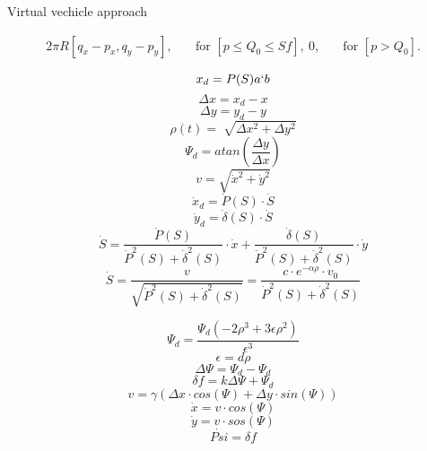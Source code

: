 \documentclass{article}
\begin{document}
Virtual vechicle approach

\begin{align}
2 \pi  R\left[q_x-p_x,q_y-p_y\right],&\quad\text{for  } \left[p\leq Q_0\leq Sf\right],\    0,&\quad\text{for  } \left[p>Q_0\right].
\end{align}


\begin{equation}
x_{d} = P(S) a \lq b
\end{equation}
\begin{equation}
\Delta x = x_{d} - x 
\end{equation}
\begin{equation}
\Delta y = y_{d} - y
\end{equation}
\begin{equation}
\rho(t) = \sqrt[]{\Delta x^2 + \Delta y^2}
\end{equation}
\begin{equation}
\Psi_{d} = atan(\frac{\Delta y}{\Delta x})
\end{equation}
\begin{equation}
v = \sqrt{\dot{x}^2 + \dot{y}^2}
\end{equation}
\begin{equation}
\dot{x}_{d} = \dot{P}(S) \cdot \dot{S}
\end{equation}
\begin{equation}
\dot{y}_{d} = \dot{\delta}(S) \cdot \dot{S}
\end{equation}
\begin{equation}
\dot{S} = \frac{\dot{P}(S)}{\dot{P}^2(S) + \dot{\delta}^2(S)} \cdot \dot{x} + \frac{\dot{\delta}(S)}{\dot{P}^2(S) + \dot{\delta}^2(S)} \cdot \dot{y} 
\end{equation}
\begin{equation}
\dot{S} = \frac{v}{\sqrt{\dot{P}^2(S) + \dot{\delta}^2(S)}} = \frac{c \cdot e^{-\alpha \rho}\cdot v_{0}}{\dot{P}^2(S) + \dot{\delta}^2(S)}
\end{equation}


\begin{equation}
\Psi_{d} = \frac{\Psi_{d}(-2\rho^3 + 3 \epsilon \rho^2)}{\epsilon^3}
\end{equation}
\begin{equation}
\epsilon = d \rho
\end{equation}
\begin{equation}
\Delta\Psi = \Psi_{d} - \Psi_{d}
\end{equation}
\begin{equation}
\delta f = k\Delta\Psi + \Psi_{d}
\end{equation}
\begin{equation}
v = \gamma(\Delta x \cdot cos(\Psi) + \Delta y \cdot sin(\Psi))
\end{equation}
\begin{equation}
\dot{x} = v \cdot cos(\Psi)
\end{equation}
\begin{equation}
\dot{y} = v \cdot sos(\Psi)
\end{equation}
\begin{equation}
\dot{Psi} = \delta f
\end{equation}
\end{document}
